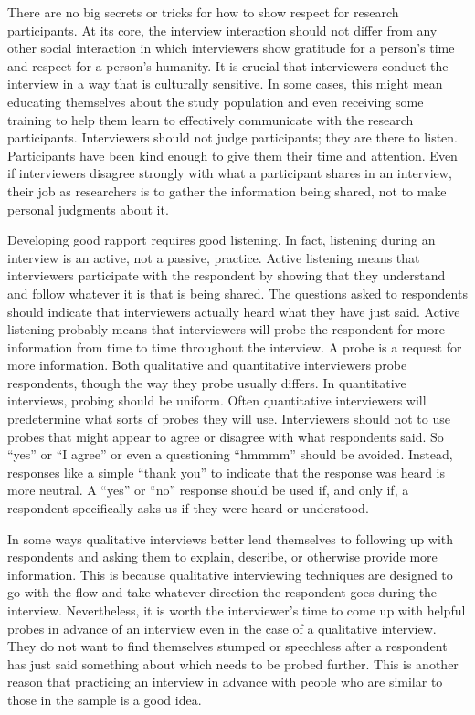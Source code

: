 There are no big secrets or tricks for how to show respect for research participants. At its core, the interview interaction should not differ from any other social interaction in which interviewers show gratitude for a person's time and respect for a person's humanity. It is crucial that interviewers conduct the interview in a way that is culturally sensitive. In some cases, this might mean educating themselves about the study population and even receiving some training to help them learn to effectively communicate with the research participants. Interviewers should not judge participants; they are there to listen. Participants have been kind enough to give them their time and attention. Even if interviewers disagree strongly with what a participant shares in an interview, their job as researchers is to gather the information being shared, not to make personal judgments about it. 

Developing good rapport requires good listening. In fact, listening during an interview is an active, not a passive, practice. Active listening means that interviewers participate with the respondent by showing that they understand and follow whatever it is that is being shared. The questions asked to respondents should indicate that interviewers actually heard what they have just said. Active listening probably means that interviewers will probe the respondent for more information from time to time throughout the interview. A probe is a request for more information. Both qualitative and quantitative interviewers probe respondents, though the way they probe usually differs. In quantitative interviews, probing should be uniform. Often quantitative interviewers will predetermine what sorts of probes they will use. Interviewers should not to use probes that might appear to agree or disagree with what respondents said. So ``yes'' or ``I agree'' or even a questioning ``hmmmm'' should be avoided. Instead, responses like a simple ``thank you'' to indicate that the response was heard is more neutral. A ``yes'' or ``no'' response should be used if, and only if, a respondent specifically asks us if they were heard or understood.

In some ways qualitative interviews better lend themselves to following up with respondents and asking them to explain, describe, or otherwise provide more information. This is because qualitative interviewing techniques are designed to go with the flow and take whatever direction the respondent goes during the interview. Nevertheless, it is worth the interviewer's time to come up with helpful probes in advance of an interview even in the case of a qualitative interview. They do not want to find themselves stumped or speechless after a respondent has just said something about which needs to be probed further. This is another reason that practicing an interview in advance with people who are similar to those in the sample is a good idea.

